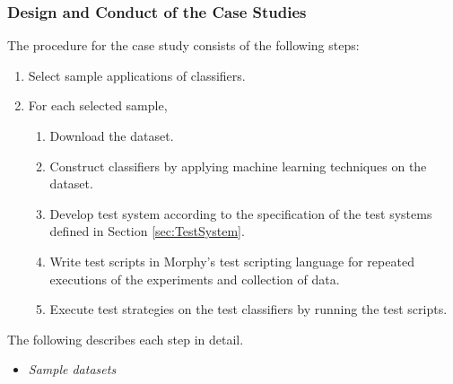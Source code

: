 \documentclass[preprint,1p,authoryear,times]{elsarticle}
\begin{document}
\subsubsection{Design and Conduct of the Case Studies}

The procedure for the case study consists of the following steps:

\begin{enumerate}
  \item Select sample applications of classifiers. 
  \item For each selected sample, 
  \begin{enumerate}
  	\item Download the dataset.
    \item Construct classifiers by applying machine learning techniques on the dataset. 
  	\item Develop test system according to the specification of the test systems defined in Section \ref{sec:TestSystem}. 
  	\item Write test scripts in Morphy's test scripting language for repeated executions of the experiments and collection of data.
  	\item Execute test strategies on the test classifiers by running the test scripts. 
  \end{enumerate}
\end{enumerate}

The following describes each step in detail. 

\begin{itemize}
\item \emph{Sample datasets}
\end{itemize}
\end{document}
